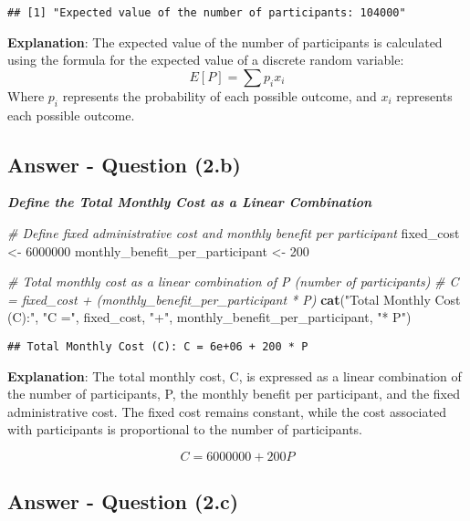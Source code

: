 \documentclass[
  11pt,
]{article}
\newenvironment{Shaded}{\begin{snugshade}}{\end{snugshade}}
\newcommand{\CommentTok}[1]{\textcolor[rgb]{0.56,0.35,0.01}{\textit{#1}}}
\newcommand{\DecValTok}[1]{\textcolor[rgb]{0.00,0.00,0.81}{#1}}
\newcommand{\FunctionTok}[1]{\textcolor[rgb]{0.13,0.29,0.53}{\textbf{#1}}}
\newcommand{\NormalTok}[1]{#1}
\newcommand{\OtherTok}[1]{\textcolor[rgb]{0.56,0.35,0.01}{#1}}
\newcommand{\StringTok}[1]{\textcolor[rgb]{0.31,0.60,0.02}{#1}}
\begin{document}
\begin{verbatim}
## [1] "Expected value of the number of participants: 104000"
\end{verbatim}

\textbf{Explanation}: The expected value of the number of participants
is calculated using the formula for the expected value of a discrete
random variable: \[E[P] = \sum p_i x_i\] Where \(p_i\) represents the
probability of each possible outcome, and \(x_i\) represents each
possible outcome.

\subsection{Answer - Question (2.b)}\label{answer---question-2.b}

\textbf{\emph{Define the Total Monthly Cost as a Linear Combination}}

\begin{Shaded}
\begin{Highlighting}[]
\CommentTok{\# Define fixed administrative cost and monthly benefit per participant}
\NormalTok{fixed\_cost }\OtherTok{\textless{}{-}} \DecValTok{6000000}
\NormalTok{monthly\_benefit\_per\_participant }\OtherTok{\textless{}{-}} \DecValTok{200}

\CommentTok{\# Total monthly cost as a linear combination of P (number of participants)}
\CommentTok{\# C = fixed\_cost + (monthly\_benefit\_per\_participant * P)}
\FunctionTok{cat}\NormalTok{(}\StringTok{"Total Monthly Cost (C):"}\NormalTok{, }\StringTok{"C ="}\NormalTok{, fixed\_cost, }\StringTok{"+"}\NormalTok{, monthly\_benefit\_per\_participant, }\StringTok{"* P"}\NormalTok{)}
\end{Highlighting}
\end{Shaded}

\begin{verbatim}
## Total Monthly Cost (C): C = 6e+06 + 200 * P
\end{verbatim}

\textbf{Explanation}: The total monthly cost, C, is expressed as a
linear combination of the number of participants, P, the monthly benefit
per participant, and the fixed administrative cost. The fixed cost
remains constant, while the cost associated with participants is
proportional to the number of participants.

\[ C = 6000000 + 200 P\]

\subsection{Answer - Question (2.c)}\label{answer---question-2.c}
\end{document}
